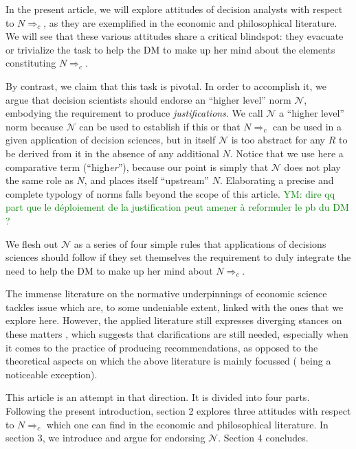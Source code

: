 \documentclass[preprint, french, english, 11pt, authoryear]{elsarticle}%
\newcommand{\commentYM}[1]{\textcolor{green}{YM: #1}}
\newcommand{\adv}{\mathscr{N}}
\begin{document}
In the present article, we will explore attitudes of decision analysts with respect to $N ⇒_c$, as they are exemplified in the economic and philosophical literature. We will see that these various attitudes share a critical blindspot: they evacuate or trivialize the task to help the \ac{DM} to make up her mind about the elements constituting $N ⇒_c$.

By contrast, we claim that this task is pivotal. In order to accomplish it, we argue that decision scientists should endorse an “higher level” norm $\adv$, embodying the requirement to produce \emph{justifications}. We call $\adv$ a “higher level” norm because $\adv$ can be used to establish if this or that $N ⇒_c$ can be used in a given application of decision sciences, but in itself $\adv$ is too abstract for any $R$ to be derived from it in the absence of any additional $N$. Notice that we use here a comparative term (“high\emph{er}”), because our point is simply that $\adv$ does not play the same role as $N$, and places itself “upstream” $N$. Elaborating a precise and complete typology of norms falls beyond the scope of this article.
\commentYM{dire qq part que le déploiement de la justification peut amener à reformuler le pb du DM ?}

We flesh out $\adv$ as a series of four simple rules that applications of decisions sciences should follow if they set themselves the requirement to duly integrate the need to help the \ac{DM} to make up her mind about $N ⇒_c$. 

The immense literature on the normative underpinnings of economic science \citep{buchanan_positive_1959,sen_nature_1967,dwyer_scientific_1985, heath_value_1994,sen_rationality_2004,mongin_value_2006,sen_idea_2009,baujard_value_2013} tackles issue which are, to some undeniable extent, linked with the ones that we explore here. However, the applied literature still expresses diverging stances on these matters \citep{spash_bulldozing_2015, scharks_dont_2016}, which suggests that clarifications are still needed, especially when it comes to the practice of producing recommendations, as opposed to the theoretical aspects on which the above literature is mainly focussed (\citet{baujard_value_2013} being a noticeable exception).

This article is an attempt in that direction. It is divided into four parts. Following the present introduction, section 2 explores three attitudes with respect to $N ⇒_c$ which one can find in the economic and philosophical literature. In section 3, we introduce and argue for endorsing $\adv$. Section 4 concludes.
\end{document}
